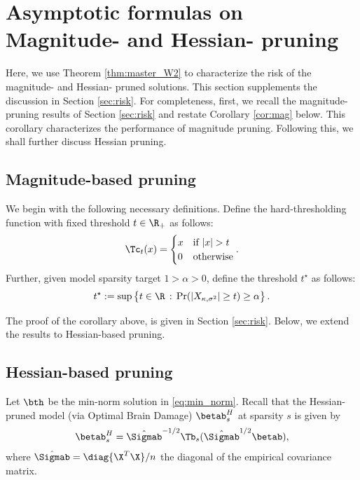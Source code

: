\section{Asymptotic formulas on Magnitude- and Hessian- pruning}\label{sec prune risk}
Here, we use Theorem \ref{thm:master_W2} to characterize the risk of the magnitude- and Hessian- pruned solutions. This section supplements the discussion in Section \ref{sec:risk}. For completeness, first, we recall the magnitude-pruning results of Section \ref{sec:risk} and restate Corollary \ref{cor:mag} below. This corollary characterizes the performance of magnitude pruning. Following this, we shall further discuss Hessian pruning.


\subsection{Magnitude-based pruning}

We begin with the following necessary definitions.  Define the hard-thresholding function with fixed threshold $t\in\R_+$ as follows:
\begin{align}\label{eq:threshold_app}
\Tc_t(x) = \begin{cases} x & \text{if } |x|>t \\ 0 & \text{otherwise} \end{cases}.
\end{align}
Further, {given model sparsity target $1>\alpha>0$}, define the threshold $t^\star$ as follows:
\begin{align}\label{eq:tstar_app}
t^\star:=\sup\left\{t\in\R\,:\, \Pr(|X_{\kappa,\sigma^2}|\geq t) \geq \alpha \right\}.
\end{align}


\cormag*

The proof of the corollary above, is given in Section \ref{sec:risk}. Below, we extend the results to Hessian-based pruning.


\subsection{Hessian-based pruning}
Let $\bth$ be the min-norm solution in \eqref{eq:min_norm}. Recall that the Hessian-pruned model (via Optimal Brain Damage) $\betab_s^H$ at sparsity $s$ is given by
\begin{align}\label{eq:hp}
\betab_s^H = \hat\Sigmab^{-1/2}\Tb_s(\hat\Sigmab^{1/2}\betab),
\end{align}
where $\hat\Sigmab=\diag{\X^T\X}/n$ the diagonal of the empirical covariance matrix. 


